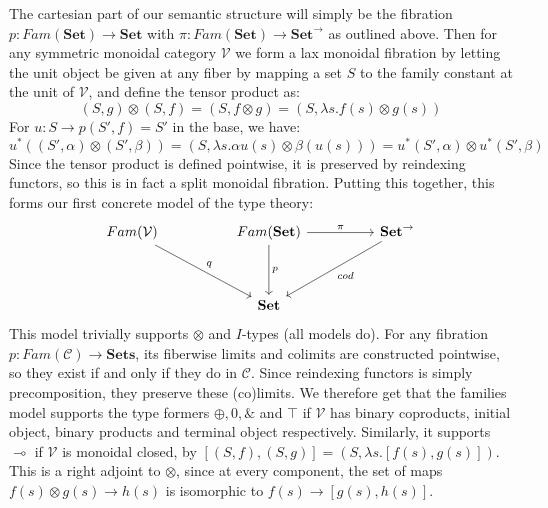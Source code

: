 The cartesian part of our semantic structure will simply be the fibration $p : Fam(\mathbf{Set}) \to \mathbf{Set}$ with $\pi : Fam(\mathbf{Set}) \to \mathbf{Set}^\to$ as outlined above. Then for any symmetric monoidal category $\mathcal{V}$ we form a lax monoidal fibration by letting the unit object be given at any fiber by mapping a set $S$ to the family constant at the unit of $\mathcal{V}$, and define the tensor product as:
\[
(S, g) \otimes (S, f) = (S, f \otimes g) = (S, \lambda s. f(s) \otimes g(s))
\]
For $u : S \to p(S', f) = S'$ in the base, we have:
\[
  u^*((S', \alpha) \otimes (S', \beta)) = (S, \lambda s.\alpha u(s) \otimes \beta(u(s))) = u^*(S', \alpha) \otimes u^*(S', \beta)
\]
Since the tensor product is defined pointwise, it is preserved by reindexing functors, so this is in fact a split monoidal fibration. Putting this together, this forms our first concrete model of the type theory:
\[
\ti
Fam(\mathcal{V}) \ar[rd, "q"]  & Fam(\mathbf{Set}) \ar[d, "p"] \ar[r, "\pi"] & \mathbf{Set}^\to \ar[ld, "cod"] \\
& \mathbf{Set}
\kz
\]
This model trivially supports $\otimes$ and $I$-types (all models do). For any fibration $p : Fam(\mathcal{C}) \to \mathbf{Sets}$, its fiberwise limits and colimits are constructed pointwise, so they exist if and only if they do in $\mathcal{C}$. Since reindexing functors is simply precomposition, they preserve these (co)limits. We therefore get that the families model supports the type formers $\oplus, 0, \&$ and $\top$ if $\mathcal{V}$ has binary coproducts, initial object, binary products and terminal object respectively. Similarly, it supports $\multimap$ if $\mathcal{V}$ is monoidal closed, by $[(S, f), (S, g)] = (S, \lambda s. [f(s),g(s)])$. This is a right adjoint to $\otimes$, since at every component, the set of maps $f(s) \otimes g(s) \to h(s)$ is isomorphic to $f(s) \to [g(s),h(s)]$.


